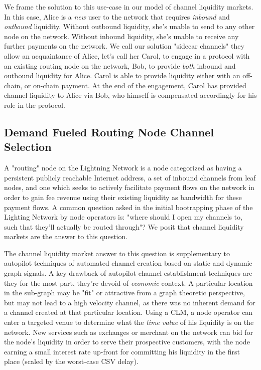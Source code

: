 \documentclass[12pt,a4paper]{article}
\theoremstyle{definition}
\begin{document}
We frame the solution to this use-case in our model of channel liquidity
markets. In this case, Alice is a \emph{new} user to the network that requires
\emph{inbound} and \emph{outbound} liquidity. Without outbound liquidity, she's
unable to send to any other node on the network. Without inbound liquidity,
she's unable to receive any further payments on the network. We call our
solution "sidecar channels" they allow an acquaintance of Alice, let's call her
Carol, to engage in a protocol with an existing routing node on the network,
Bob, to provide \emph{both} inbound and outbound liquidity for Alice. Carol is
able to provide liquidity either with an off-chain, or on-chain payment. At the
end of the engagement, Carol has provided channel liquidity to Alice via Bob,
who himself is compensated accordingly for his role in the protocol.

\subsection{Demand Fueled Routing Node Channel Selection}

A "routing" node on the Lightning Network is a node categorized as having a
persistent publicly reachable Internet address, a set of inbound channels from
leaf nodes, and one which seeks to actively facilitate payment flows on the
network in order to gain fee revenue using their existing liquidity as
bandwidth for these payment flows. A common question asked in the initial
bootrapping phase of the Lighting Network by node operators is: "where should I
open my channels to, such that they'll actually be routed through"? We posit
that channel liquidity markets are the answer to this question.

The channel liquidity market answer to this question is  supplementary to
autopilot \cite{autopilot} techniques of automated channel creation based on
static and dynamic graph signals. A key drawback of autopilot channel
establishment techniques are they for the most part, they're devoid of
\emph{economic} context. A particular location in the sub-graph may be "fit" or
attractive from a graph theoretic perspective, but may not lead to a high
velocity channel, as there was no inherent demand for a channel created at that
particular location. Using a CLM, a node operator can enter a targeted venue to
determine what the \emph{time value} of his liquidity is on the network. New
services such as exchanges or merchant on the network can bid for the node's
liquidity in order to serve their prospective customers, with the node earning
a small interest rate up-front for committing his liquidity in the first place
(scaled by the worst-case CSV delay).
\end{document}
